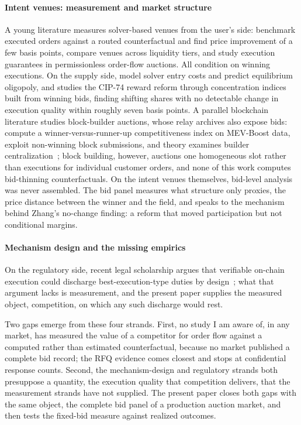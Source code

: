\documentclass[11pt]{article}
\theoremstyle{plain}
\theoremstyle{definition}
\theoremstyle{remark}
\begin{document}
\paragraph{Intent venues: measurement and market structure} A young literature measures solver-based venues from the user's side: \citet{bachu2024quantifying} benchmark executed orders against a routed counterfactual and find price improvement of a few basis points, \citet{yuminaga2025welfare} compare venues across liquidity tiers, and \citet{watts2025failure} study execution guarantees in permissionless order-flow auctions. All condition on winning executions. On the supply side, \citet{chitra2024intent} model solver entry costs and predict equilibrium oligopoly, and \citet{zhang2026incentives} studies the CIP-74 reward reform through concentration indices built from winning bids, finding shifting shares with no detectable change in execution quality within roughly seven basis points. A parallel blockchain literature studies block-builder auctions, whose relay archives also expose bids: \citet{yang2024builder} compute a winner-versus-runner-up competitiveness index on MEV-Boost data, \citet{pahari2025exclusive} exploit non-winning block submissions, and theory examines builder centralization~\citep{bahrani2024pbs,gupta2023centralizing}; block building, however, auctions one homogeneous slot rather than executions for individual customer orders, and none of this work computes bid-thinning counterfactuals. On the intent venues themselves, bid-level analysis was never assembled. The bid panel measures what structure only proxies, the price distance between the winner and the field, and speaks to the mechanism behind Zhang's no-change finding: a reform that moved participation but not conditional margins.

\paragraph{Mechanism design and the missing empirics} On the regulatory side, recent legal scholarship argues that verifiable on-chain execution could discharge best-execution-type duties by design~\citep{le2026fairness}; what that argument lacks is measurement, and the present paper supplies the measured object, competition, on which any such discharge would rest.

Two gaps emerge from these four strands. First, no study I am aware of, in any market, has measured the value of a competitor for order flow against a computed rather than estimated counterfactual, because no market published a complete bid record; the RFQ evidence comes closest and stops at confidential response counts. Second, the mechanism-design and regulatory strands both presuppose a quantity, the execution quality that competition delivers, that the measurement strands have not supplied. The present paper closes both gaps with the same object, the complete bid panel of a production auction market, and then tests the fixed-bid measure against realized outcomes.
\end{document}
